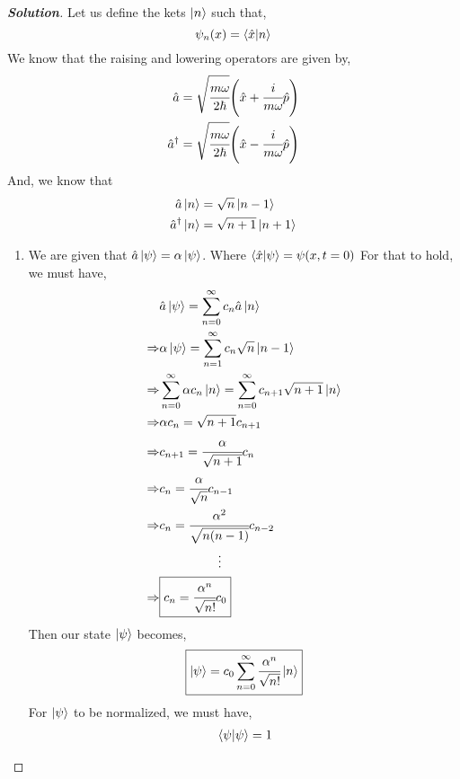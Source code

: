 \documentclass[10pt]{scrartcl}
\theoremstyle{definition}
\newenvironment{solution} {\begin{proof}[\normalfont \textbf{Solution}]} {\end{proof}}
\newcommand*{\Op}{\hat{p}}
\newcommand*{\Ox}{\hat{x}}
\newcommand*{\Oa}{\hat{a}}
\begin{document}
\begin{solution}
    Let us define the kets $\ket{n}$ such that, $$\psi_n(x) = \ip{\Ox}{n}$$ We know that the raising
    and lowering operators are given by,
    \begin{align*}
        \Oa &= \sqrt{\cfrac{m\omega}{2\hbar}}\qty(\Ox + \cfrac{i}{m\omega}\Op) \\
        \Oa^\dagger &= \sqrt{\cfrac{m\omega}{2\hbar}}\qty(\Ox - \cfrac{i}{m\omega}\Op)
    \end{align*}
    And, we know that 
    \begin{align*}
        \Oa \ket{n} &= \sqrt{n}\ket{n - 1} \\
        \Oa^\dagger \ket{n} &= \sqrt{n + 1}\ket{n + 1}
    \end{align*}
    \begin{enumerate}[label=(\alph*)]
        \item We are given that $\Oa \ket{\psi} = \alpha \ket{\psi}$. Where $\ip{\Ox}{\psi} = \psi(x, t = 0)$ For that to hold, we must have, 
            \begin{align*}
                &\Oa\ket{\psi} = \sum_{n = 0}^{\infty} c_n \Oa \ket{n} \\
                \Rightarrow &\alpha \ket{\psi} = \sum_{n = 1}^{\infty} c_n \sqrt{n} \ket{n - 1} \\
                \Rightarrow &\sum_{n = 0}^{\infty} \alpha c_n \ket{n} = \sum_{n = 0}^{\infty} c_{n + 1} \sqrt{n + 1} \ket{n} \\ 
                \Rightarrow &\alpha c_n = \sqrt{n + 1} c_{n + 1} \\
                \Rightarrow &c_{n + 1} = \cfrac{\alpha}{\sqrt{n + 1}} c_{n}\\
                \Rightarrow &c_{n} = \cfrac{\alpha}{\sqrt{n}}c_{n - 1} \\
                \Rightarrow &c_{n} = \cfrac{\alpha^2}{\sqrt{n(n-1)}} c_{n - 2}\\
                            &\quad \quad \quad \quad ~~ \vdots \\
                \Rightarrow &\boxed{c_n = \cfrac{\alpha^n}{\sqrt{n!}}c_0}
            \end{align*}
            Then our state $\ket{\psi}$ becomes, $$\boxed{\ket{\psi} = c_0 \sum_{n = 0}^{\infty} \cfrac{\alpha^n}{\sqrt{n!}} \ket{n}}$$
            For $\ket\psi$ to be normalized, we must have,
            \begin{align*}
                &\ip{\psi}{\psi} = 1 \\ 

\end{align*}
\end{enumerate}
\end{solution}
\end{document}
